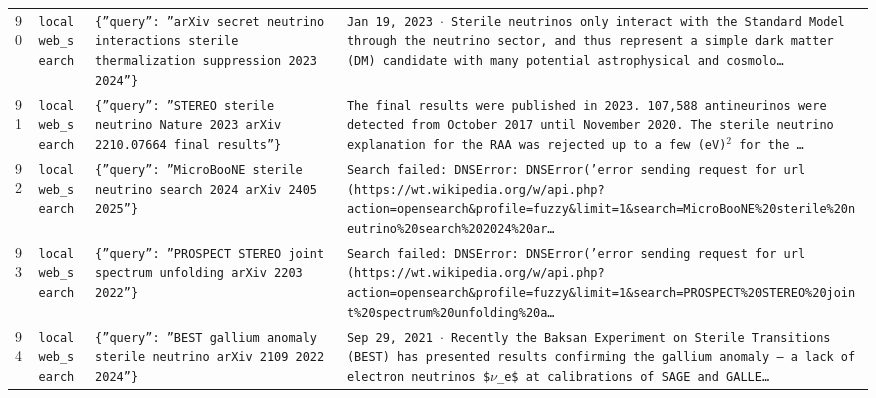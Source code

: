 \documentclass[11pt,a4paper]{article}
\begin{document}
\begin{longtable}{@{}p{}p{}p{}p{}@{}}
90 & \texttt{local}\newline\texttt{web\_\allowbreak{}search} & \texttt{\{''query'':\allowbreak{} ''arXiv secret neutrino interactions sterile thermalization suppression 2023 2024''\}\allowbreak{}} & \texttt{Jan 19,\allowbreak{} 2023 $\cdot$ Sterile neutrinos only interact with the Standard Model through the neutrino sector,\allowbreak{} and thus represent a simple dark matter (DM)\allowbreak{} candidate with many potential astrophysical and cosmolo\ldots{}\allowbreak{}} \\
91 & \texttt{local}\newline\texttt{web\_\allowbreak{}search} & \texttt{\{''query'':\allowbreak{} ''STEREO sterile neutrino Nature 2023 arXiv 2210.07664 final results''\}\allowbreak{}} & \texttt{The final results were published in 2023. 107,\allowbreak{}588 antineurinos were detected from October 2017 until November 2020. The sterile neutrino explanation for the RAA was rejected up to a few (eV)\allowbreak{}$^2$ for the \ldots{}\allowbreak{}} \\
92 & \texttt{local}\newline\texttt{web\_\allowbreak{}search} & \texttt{\{''query'':\allowbreak{} ''MicroBooNE sterile neutrino search 2024 arXiv 2405 2025''\}\allowbreak{}} & \texttt{Search failed:\allowbreak{} DNSError:\allowbreak{} DNSError('error sending request for url (https:\allowbreak{}/\allowbreak{}/\allowbreak{}wt.wikipedia.org/\allowbreak{}w/\allowbreak{}api.php?action=\allowbreak{}opensearch\&profile=\allowbreak{}fuzzy\&limit=\allowbreak{}1\&search=\allowbreak{}MicroBooNE\%20sterile\%20neutrino\%20search\%202024\%20ar\ldots{}\allowbreak{}} \\
93 & \texttt{local}\newline\texttt{web\_\allowbreak{}search} & \texttt{\{''query'':\allowbreak{} ''PROSPECT STEREO joint spectrum unfolding arXiv 2203 2022''\}\allowbreak{}} & \texttt{Search failed:\allowbreak{} DNSError:\allowbreak{} DNSError('error sending request for url (https:\allowbreak{}/\allowbreak{}/\allowbreak{}wt.wikipedia.org/\allowbreak{}w/\allowbreak{}api.php?action=\allowbreak{}opensearch\&profile=\allowbreak{}fuzzy\&limit=\allowbreak{}1\&search=\allowbreak{}PROSPECT\%20STEREO\%20joint\%20spectrum\%20unfolding\%20a\ldots{}\allowbreak{}} \\
94 & \texttt{local}\newline\texttt{web\_\allowbreak{}search} & \texttt{\{''query'':\allowbreak{} ''BEST gallium anomaly sterile neutrino arXiv 2109 2022 2024''\}\allowbreak{}} & \texttt{Sep 29,\allowbreak{} 2021 $\cdot$ Recently the Baksan Experiment on Sterile Transitions (BEST)\allowbreak{} has presented results confirming the gallium anomaly -- a lack of electron neutrinos \$$\nu$\_\allowbreak{}e\$ at calibrations of SAGE and GALLE\ldots{}\allowbreak{}} \\

\end{longtable}
\end{document}
